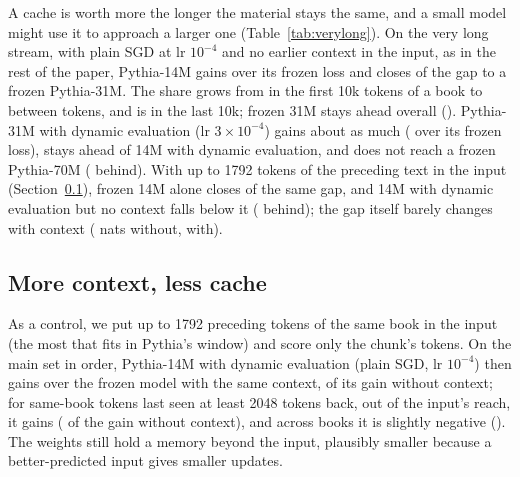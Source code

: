 \documentclass[times,twocolumn,final,authoryear]{elsarticle}
\begin{document}
A cache is worth more the longer the material stays the same, and a small model might use it to approach a larger one (Table~\ref{tab:verylong}).
On the very long stream, with plain SGD at lr $10^{-4}$ and no earlier context in the input, as in the rest of the paper, Pythia-14M gains \vlGainOnlineFourteenPM{} over its frozen loss and closes \gapClosedFourteen{} of the gap to a frozen Pythia-31M.
The share grows from \gapFirstBin{} in the first 10k tokens of a book to \gapPeak{} between \gapPeakBin{} tokens, and is \gapLastBin{} in the last 10k; frozen 31M stays ahead overall (\vlFrozenThirtyOneAheadPM{}).
Pythia-31M with dynamic evaluation (lr $3\times10^{-4}$) gains about as much (\vlOnlineMinusFrozenThirtyOnePM{} over its frozen loss), stays ahead of 14M with dynamic evaluation, and does not reach a frozen Pythia-70M (\vlFrozenSeventyAheadPM{} behind).
With up to 1792 tokens of the preceding text in the input (Section~\ref{sec:context}), frozen 14M alone closes \vlCtxGapClosed{} of the same gap, and 14M with dynamic evaluation but no context falls below it (\vlCtxFrozenAheadPM{} behind); the gap itself barely changes with context (\vlGapNoContext{} nats without, \vlGapContext{} with).

\begin{table}[t]
\caption{Four PG-19 books of 200k tokens, read book after book: loss, gain over frozen Pythia-14M ($\pm$ SE over 4 books, paired) and share of the gap between frozen 14M and frozen 31M closed. Dynamic evaluation: plain SGD on all parameters.}
\label{tab:verylong}
\centering\footnotesize\setlength{\tabcolsep}{3pt}
\resizebox{\columnwidth}{!}{}
\end{table}

\subsection{More context, less cache}\label{sec:context}

As a control, we put up to 1792 preceding tokens of the same book in the input (the most that fits in Pythia's window) and score only the chunk's tokens.
On the main set in order, Pythia-14M with dynamic evaluation (plain SGD, lr $10^{-4}$) then gains \fcGainAllPM{} over the frozen model with the same context, \fcShareAll{} of its gain without context; for same-book tokens last seen at least 2048 tokens back, out of the input's reach, it gains \fcGainSameFarPM{} (\fcShareSameFar{} of the gain without context), and across books it is slightly negative (\fcGainEarlierFarPM{}).
The weights still hold a memory beyond the input, plausibly smaller because a better-predicted input gives smaller updates.
\end{document}
